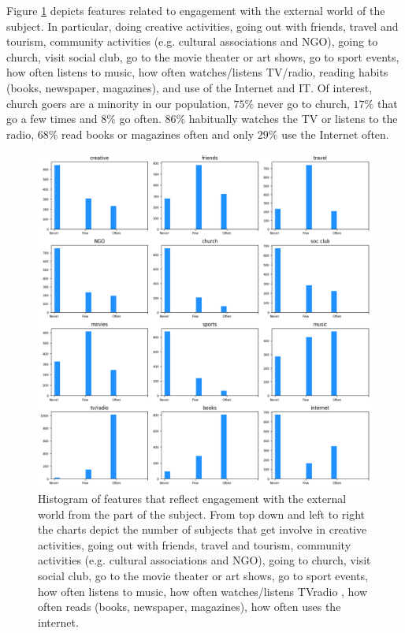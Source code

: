 \documentclass[11pt]{article}
\theoremstyle{definition}
\theoremstyle{remark}
\begin{document}
Figure \ref{fig:engage} depicts features related to engagement with the external world of the subject. In particular, doing creative activities, going out with friends, travel and tourism, community activities (e.g. cultural associations and NGO), going to church, visit social club, go to the movie theater or art shows, go to sport events, how often listens to music, how often watches/listens TV/radio, reading habits (books, newspaper, magazines), and use of the Internet and IT.
Of interest, church goers are a minority in our population, $75\%$ never go to church, $17\%$ that go a few times and $8\%$ go often. $86\%$ habitually watches the TV or listens to the radio, $68\%$ read books or magazines often and only $29\%$ use the Internet often.

\begin{figure}[H]
        \centering
        \includegraphics[keepaspectratio, width=\linewidth]{figures/Fig_engage}
        \caption{Histogram of features that reflect engagement with the external world from the part of the subject. From top down and left to right the charts depict the number of subjects that get involve in creative activities, going out with friends, travel and tourism, community activities (e.g. cultural associations and NGO), going to church, visit social club, go to the movie theater or art shows, go to sport events, how often listens to music, how often watches/listens TVradio , how often reads (books, newspaper, magazines), how often uses the internet.} 
        \label{fig:engage}
\end{figure}
\end{document}
